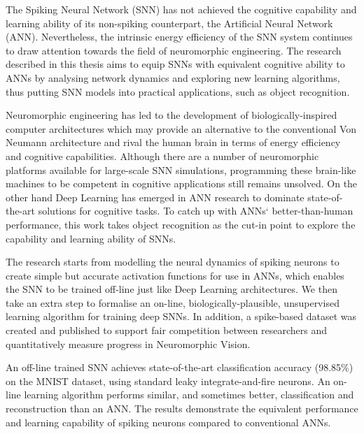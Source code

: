 The Spiking Neural Network (SNN) has not achieved the cognitive capability and learning ability of its non-spiking counterpart, the Artificial Neural Network (ANN).
Nevertheless, the intrinsic energy efficiency of the SNN system continues to draw attention towards the field of neuromorphic engineering.
The research described in this thesis aims to equip SNNs with equivalent cognitive ability to ANNs by analysing network dynamics and exploring new learning algorithms, thus putting SNN models into practical applications, such as object recognition.

Neuromorphic engineering has led to the development of biologically-inspired computer architectures which may provide an alternative to the conventional Von Neumann architecture and rival the human brain in terms of energy efficiency and cognitive capabilities.
Although there are a number of neuromorphic platforms available for large-scale SNN simulations, programming these brain-like machines to be competent in cognitive applications still remains unsolved.
On the other hand Deep Learning has emerged in ANN research to dominate state-of-the-art solutions for cognitive tasks.
To catch up with ANNs‘ better-than-human performance, this work takes object recognition as the cut-in point to explore the capability and learning ability of SNNs.

The research starts from modelling the neural dynamics of spiking neurons to create simple but accurate activation functions for use in ANNs, which enables the SNN to be trained off-line just like Deep Learning architectures.
We then take an extra step to formalise an on-line, biologically-plausible, unsupervised learning algorithm for training deep SNNs.
In addition, a spike-based dataset was created and published to support fair competition between researchers and quantitatively measure progress in Neuromorphic Vision.

An off-line trained SNN achieves state-of-the-art classification accuracy (98.85\%) on the MNIST dataset, using standard leaky integrate-and-fire neurons.
An on-line learning algorithm performs similar, and sometimes better, classification and reconstruction than an ANN. 
The results demonstrate the equivalent performance and learning capability of spiking neurons compared to conventional ANNs.
